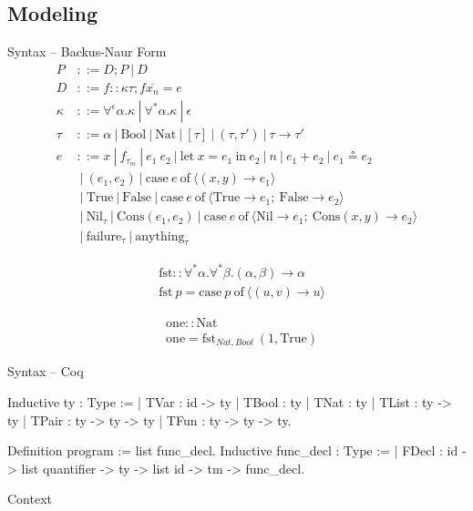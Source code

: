 \documentclass{beamer}
\begin{document}
\subsection{Modeling}
\begin{frame}{Syntax -- Backus-Naur Form}
\begin{align*}
P &::= D;P \:|\:D \\
D &::= f :: \kappa \tau; f \overline{x_{n}} = e\\
\kappa &::= \forall^{\epsilon} \alpha.\kappa \:|\: \forall^{*}\alpha.\kappa \:|\: \epsilon \\
\tau &::= \alpha \:|\: \text{Bool} \:|\: \text{Nat} \:|\: [\tau] \:|\: (\tau,\tau ') \:|\: \tau \rightarrow \tau ' \\
e &::= x \:|\: f_{\overline{\tau_{m}}} \:|\: e_{1}\: e_{2} \:|\: \text{let}\: x = e_{1} \:\text{in}\: e_{2} \:|\: n \:|\: e_{1} + e_{2} \:|\: e_{1} \circeq e_{2}\\
&\:|\: (e_{1},e_{2}) \:|\: \text{case}\: e \:\text{of}\: \langle (x,y) \rightarrow e_{1}\rangle\\
&\:|\: \text{True} \:|\: \text{False} \:|\: \text{case}\: e \:\text{of}\: \langle \text{True} \rightarrow e_{1};\:\text{False} \rightarrow e_{2}\rangle\\
&\:|\: \text{Nil}_{\tau} \:|\: \text{Cons}(e_{1}, e_{2}) \:|\: \text{case}\: e \:\text{of}\: \langle \text{Nil} \rightarrow e_{1};\:\text{Cons}(x,y) \rightarrow e_{2}\rangle\\
&\:|\: \text{failure}_{\tau} \:|\: \text{anything}_{\tau}
\end{align*}
\end{frame}
\begin{frame}
\begin{minipage}{.45 \linewidth}
	\begin{align*}
	&\text{fst}::\forall^{*}\alpha.\forall^{*}\beta.(\alpha, \beta) \rightarrow\alpha\\
	&\text{fst}\: p = \text{case}\: p\: \text{of}\: \langle(u,v) \rightarrow u\rangle
	\end{align*}
\end{minipage}
\begin{minipage}{.45 \linewidth}
	\begin{align*}
	&\text{one} :: \text{Nat}\\
	&\text{one} = \text{fst}_{Nat, Bool} ~ (1, \text{True})
	\end{align*}
\end{minipage}
\end{frame}
\begin{frame}[fragile]{Syntax -- Coq}
\begin{coqcode}	
Inductive ty : Type :=
  | TVar  : id -> ty
  | TBool : ty
  | TNat  : ty
  | TList : ty -> ty
  | TPair : ty -> ty -> ty
  | TFun  : ty -> ty -> ty.

Definition program := list func_decl.
Inductive func_decl : Type :=
  | FDecl : id -> list quantifier ->
	ty -> list id -> tm -> func_decl.
\end{coqcode}
\end{frame}
\begin{frame}{Context}
\end{frame}
\end{document}
